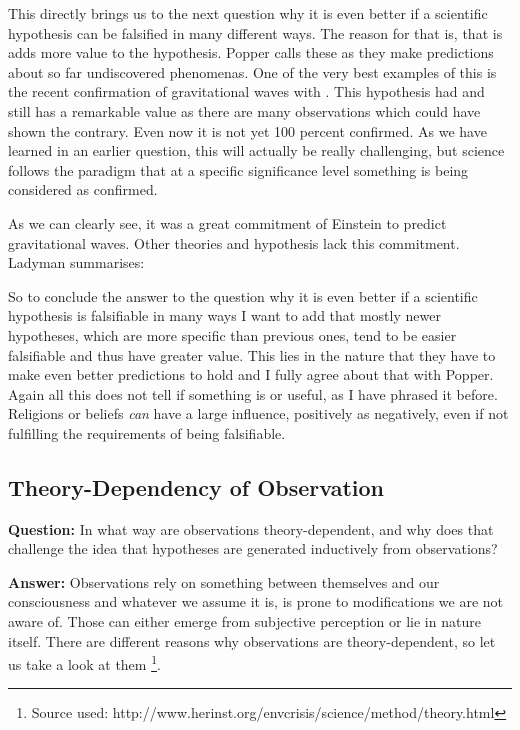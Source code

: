 \documentclass[11pt]{scrartcl}
\begin{document}
This directly brings us to the next question why it is even better if a scientific hypothesis can be falsified in many different ways. The reason for that is, that is adds more value to the hypothesis. Popper calls these  \cite[p. 68]{ladyman} as they make predictions about so far undiscovered phenomenas. One of the very best examples of this is the recent confirmation of gravitational waves with  \cite{ligo}. This hypothesis had and still has a remarkable value as there are many observations which could have shown the contrary. Even now it is not yet 100 percent confirmed. As we have learned in an earlier question, this will actually be really challenging, but science follows the paradigm that at a specific significance level something is being considered as confirmed.

As we can clearly see, it was a great commitment of Einstein to predict gravitational waves. Other theories and hypothesis lack this commitment. Ladyman summarises:  \cite[p. 71]{ladyman}

So to conclude the answer to the question why it is even better if a scientific hypothesis is falsifiable in many ways I want to add that mostly newer hypotheses, which are more specific than previous ones, tend to be easier falsifiable and thus have greater value. This lies in the nature that they have to make even better predictions to hold \cite[p. 73]{ladyman} and I fully agree about that with Popper. Again all this does not tell if something is  \cite[p. 72]{ladyman} or useful, as I have phrased it before. Religions or beliefs \textit{can} have a large influence, positively as negatively, even if not fulfilling the requirements of being falsifiable.

\subsection{Theory-Dependency of Observation}

\textbf{Question:} In what way are observations theory-dependent, and why does that challenge the idea that hypotheses are generated inductively from observations?

\bigbreak

\textbf{Answer:} Observations rely on something between themselves and our consciousness and whatever we assume it is, is prone to modifications we are not aware of. Those can either emerge from subjective perception or lie in nature itself. There are different reasons why observations are theory-dependent, so let us take a look at them \footnote{Source used: http://www.herinst.org/envcrisis/science/method/theory.html}.
\end{document}
